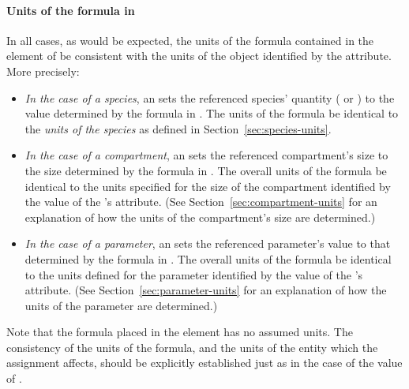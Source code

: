 \paragraph{Units of the  formula in }

In all cases, as would be expected, the units of the formula
contained in the  element of
\EventAssignment {} be consistent with the units of the object
identified by the  attribute.  More
precisely:
\begin{itemize}
  
\item \emph{In the case of a species}, an \EventAssignment sets
  the referenced species' quantity ( or
  ) to the value determined by the
  formula in .  The units of the  formula
   be identical to the \emph{units of the species} as defined
  in Section~\ref{sec:species-units}.
  
\item \emph{In the case of a compartment}, an \EventAssignment
  sets the referenced compartment's size to the size determined by
  the formula in .  The overall units of the formula
   be identical to the units specified for the size of the
  compartment identified by the value of the \EventAssignment's
   attribute.  (See
  Section~\ref{sec:compartment-units} for an explanation of how
  the units of the compartment's size are determined.)
  
\item \emph{In the case of a parameter}, an \EventAssignment sets
  the referenced parameter's value to that determined by the
  formula in .  The overall units of the formula 
  be identical to the units defined for the parameter identified
  by the value of the \EventAssignment's 
  attribute.  (See Section~\ref{sec:parameter-units} for
  an explanation of how the units of the parameter are
  determined.)

\end{itemize}

\begin{blockChanged}
Note that the formula placed in the  element
has no assumed units.  The consistency of the units of the
formula, and the units of the entity which the assignment affects,
should be explicitly established just as in the case of the value of
.
\end{blockChanged}


